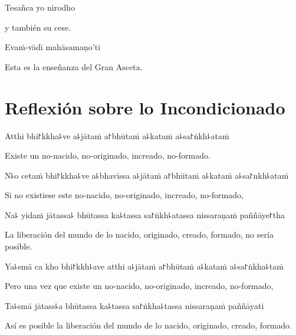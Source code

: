 Tesañca yo nirodho

\begin{english}
  y también su cese.
\end{english}

Evaṁ-vādī mahāsamaṇo'ti

\begin{english}
  Esta es la enseñanza del Gran Asceta.
\end{english}


\chapter[Incondicionado]{Reflexión sobre lo Incondicionado}


\begin{leader}
\end{leader}

Atthi bhi꜓kkha꜕ve a꜕jātaṁ a꜓bhūtaṁ a꜕kataṁ a꜕sa꜓ṅkh꜕ataṁ

\begin{english}
  Existe un no-nacido, no-originado, increado, no-formado.
\end{english}

N꜕o cetaṁ bhi꜓kkha꜕ve a꜕bhavissa a꜕jātaṁ a꜓bhūtaṁ a꜕kataṁ a꜕sa꜓nkh꜕ataṁ

\begin{english}
 Si no existiese este no-nacido, no-originado, increado, no-formado,
\end{english}

Na꜕ yidaṁ jātassa꜕ bhūtassa ka꜕tassa sa꜓ṅkh꜕atassa nissaraṇaṁ paññāye꜓tha

\begin{english}
  La liberación del mundo de lo nacido, originado, creado, formado, no sería posible.
\end{english}

Ya꜕smā ca kho bhi꜓kkh꜕ave atthi a꜕jātaṁ a꜓bhūtaṁ a꜕kataṁ a꜕sa꜓ṅkha꜕taṁ

\begin{english}
  Pero una vez que existe un no-nacido, no-originado, increado, no-formado,
\end{english}

Ta꜕smā jātass꜕a bhūtassa ka꜕tassa sa꜓ṅkha꜕tassa nissaraṇaṁ paññāyati

\begin{english}
  Así es posible la liberación del mundo de lo nacido, originado, creado, formado.
\end{english}

